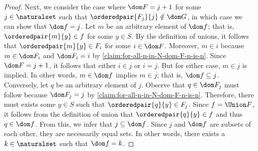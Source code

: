 \begin{proof}
    \vspace{0.3cm}
    \noindent
    Next, we consider the case where \( \dom F = j + 1 \) for some \( j \in \naturalset \) such that \( \orderedpair{F_{j}}{j} \notin \dom G \), in which
    case we can show that \( \dom f = j \).
    Let \( m \) be an arbitrary element of \( \dom f \); that is, \( \orderedpair{m}{y} \in f \) for some \( y \in S \).
    By the definition of unions, it follows that \( \orderedpair{m}{y} \in F_{i} \) for some \( i \in \dom F \).
    Moreover, \( m \in i \) because \( m \in \dom F_{i} \) and \( \dom F_{i} = i \) by \cref{claim:for-all-n-in-N-dom-F-n-is-n}.
    Since \( \dom F = j + 1 \), it follows that either \( i \in j \) or \( i = j \).
    But for either case, \( m \in j \) is implied.
    In other words, \( m \in \dom f \) implies \( m \in j \); that is, \( \dom f \subseteq j \).
    Conversely, let \( q \) be an arbitrary element of \( j \).
    Observe that \( q \in \dom F_{j} \) must follow because \( \dom F_{j} = j \) by \cref{claim:for-all-n-in-N-dom-F-n-is-n}.
    Therefore, there must exists some \( y \in S \) such that \( \orderedpair{q}{y} \in F_{j} \).
    Since \( f = \Union F \), it follows from the definition of union that \( \orderedpair{q}{y} \in f \) and thus \( q \in \dom f \).
    From this, we infer that \( j \subseteq \dom f \).
    Since \( j \) and \( \dom f \) are subsets of each other, they are necessarily equal sets.
    In other words, there exists a \( k \in \naturalset \) such that \( \dom f = k \).


\end{proof}
